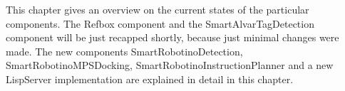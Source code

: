 This chapter gives an overview on the current states of the particular components. The Refbox component and the SmartAlvarTagDetection component will be just recapped shortly, because just minimal changes were made.
The new components SmartRobotinoDetection, SmartRobotinoMPSDocking, SmartRobotinoInstructionPlanner and a new LispServer implementation are explained in detail in this chapter.
